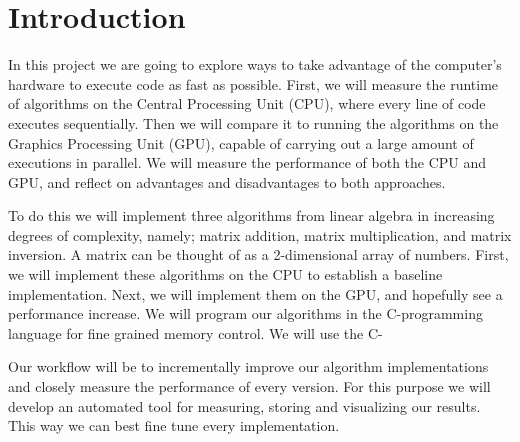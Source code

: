 \section{Introduction}

In this project we are going to explore ways to take advantage of the computer's hardware to execute code as fast as possible. First, we will measure the runtime of algorithms on the Central Processing Unit (CPU), where every line of code executes sequentially. Then we will compare it to running the algorithms on the Graphics Processing Unit (GPU), capable of carrying out a large amount of executions in parallel. We will measure the performance of both the CPU and GPU, and reflect on advantages and disadvantages to both approaches. 

To do this we will implement three algorithms from linear algebra in increasing degrees of complexity, namely; matrix addition, matrix multiplication, and matrix inversion. A matrix can be thought of as a 2-dimensional array of numbers. First, we will implement these algorithms on the CPU to establish a baseline implementation. Next, we will implement them on the GPU, and hopefully see a performance increase. We will program our algorithms in the C-programming language for fine grained memory control. We will use the C-

Our workflow will be to incrementally improve our algorithm implementations and closely measure the performance of every version. For this purpose we will develop an automated tool for measuring, storing and visualizing our results. This way we can best fine tune every implementation. 

